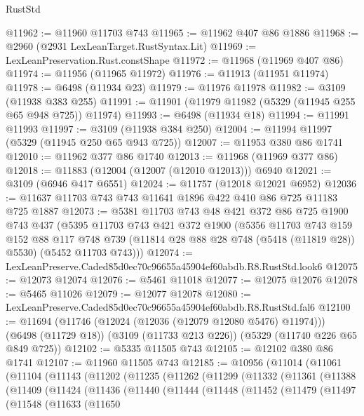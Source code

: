 \begin{lexlean}{RustStd}
\begin{coremodule}
@11962 := @11960 @11703 @743
@11965 := @11962 @407 @86 @1886
@11968 := @2960 (@2931 LexLeanTarget.RustSyntax.Lit)
@11969 := LexLeanPreservation.Rust.constShape
@11972 := @11968 (@11969 @407 @86)
@11974 := @11956 (@11965 @11972)
@11976 := @11913 (@11951 @11974)
@11978 := @6498 (@11934 @23)
@11979 := @11976 @11978
@11982 := @3109 (@11938 @383 @255)
@11991 := @11901 (@11979 @11982 (@5329 (@11945 @255 @65 @948 @725)) @11974)
@11993 := @6498 (@11934 @18)
@11994 := @11991 @11993
@11997 := @3109 (@11938 @384 @250)
@12004 := @11994 @11997 (@5329 (@11945 @250 @65 @943 @725))
@12007 := @11953 @380 @86 @1741
@12010 := @11962 @377 @86 @1740
@12013 := @11968 (@11969 @377 @86)
@12018 := @11883 (@12004 (@12007 (@12010 @12013))) @6940
@12021 := @3109 (@6946 @417 @6551)
@12024 := @11757 (@12018 @12021 @6952)
@12036 := @11637 @11703 @743 @743 @11641 @1896 @422 @410 @86 @725 @11183 @725 @1887
@12073 := @5381
    @11703
    @743
    @48
    @421
    @372
    @86
    @725
    @1900
    @743
    @437
    (@5395
      @11703
      @743
      @421
      @372
      @1900
      (@5356
        @11703
        @743
        @159
        @152
        @88
        @117
        @748
        @739
        (@11814 @28 @88 @28 @748 (@5418 (@11819 @28)) @5530)
        (@5452 @11703 @743)))
@12074 := LexLeanPreserve.Caded85d0ec70c96655a45904ef60abdb.R8.RustStd.look6
@12075 := @12073 @12074
@12076 := @5461 @11018
@12077 := @12075 @12076
@12078 := @5465 @11026
@12079 := @12077 @12078
@12080 := LexLeanPreserve.Caded85d0ec70c96655a45904ef60abdb.R8.RustStd.fal6
@12100 := @11694
    (@11746 (@12024 (@12036 (@12079 @12080 @5476) @11974)))
    (@6498 (@11729 @18))
    (@3109 (@11733 @213 @226))
    (@5329 (@11740 @226 @65 @849 @725))
@12102 := @5335 @11505 @743
@12105 := @12102 @380 @86 @1741
@12107 := @11960 @11505 @743
@12185 := @10956
    (@11014
      (@11061
        (@11104
          (@11143
            (@11202
              (@11235
                (@11262
                  (@11299
                    (@11332
                      (@11361
                        (@11388
                          (@11409
                            (@11424
                              (@11436
                                (@11440
                                  (@11444
                                    (@11448
                                      (@11452
                                        (@11479
                                          (@11497
                                            (@11548
                                              (@11633
                                                (@11650

\end{coremodule}
\end{lexlean}

